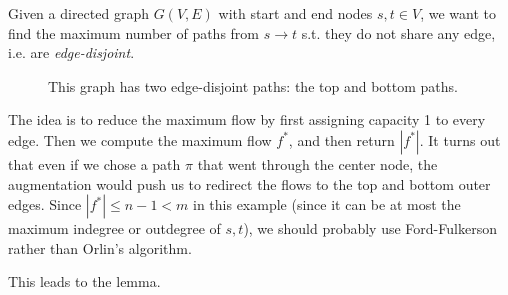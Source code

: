  \begin{example}
    Given a directed graph $G(V, E)$ with start and end nodes $s, t \in V$, we want to find the maximum number of paths from $s \rightarrow t$ s.t. they do not share any edge, i.e. are \textit{edge-disjoint}. 
    \begin{figure}[H]
      \centering 
      \caption{This graph has two edge-disjoint paths: the top and bottom paths. } 
      \label{fig:edge_disjoint}
    \end{figure}
    
    The idea is to reduce the maximum flow by first assigning capacity 1 to every edge. Then we compute the maximum flow $f^\ast$, and then return $|f^\ast|$. It turns out that even if we chose a path $\pi$ that went through the center node, the augmentation would push us to redirect the flows to the top and bottom outer edges. Since $|f^\ast| \leq n-1 < m$ in this example (since it can be at most the maximum indegree or outdegree of $s, t$), we should probably use Ford-Fulkerson rather than Orlin's algorithm. 
  \end{example}

  This leads to the lemma. 

